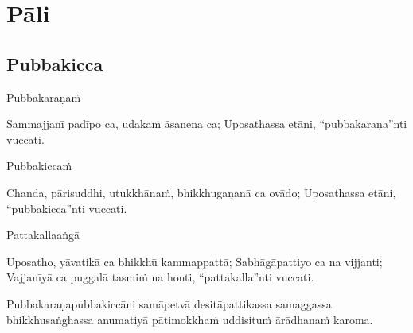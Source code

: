 
\chapter{Pāli}

\clearpage

\section{Pubbakicca}
\label{pubbakicca}

Pubbakaraṇaṁ

Sammajjanī padīpo ca, udakaṁ āsanena ca;
Uposathassa etāni, “pubbakaraṇa”nti vuccati.

Pubbakiccaṁ

Chanda, pārisuddhi, utukkhānaṁ, bhikkhugaṇanā ca ovādo;
Uposathassa etāni, “pubbakicca”nti vuccati.

Pattakallaaṅgā

Uposatho, yāvatikā ca bhikkhū kammappattā;
Sabhāgāpattiyo ca na vijjanti;
Vajjanīyā ca puggalā tasmiṁ na honti, “pattakalla”nti vuccati.

Pubbakaraṇapubbakiccāni samāpetvā desitāpattikassa samaggassa bhikkhusaṅghassa anumatiyā pātimokkhaṁ uddisituṁ ārādhanaṁ karoma.

\clearpage
